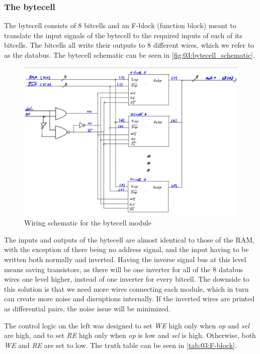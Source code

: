 \subsubsection{The bytecell}
The bytecell consists of 8 bitcells and an F-block (function block) meant to translate the input signals of the bytecell to the required inputs of each of its bitcells. The bitcells all write their outputs to 8 different wires, which we refer to as the databus. The bytecell schematic can be seen in \autoref{fig:03:bytecell_schematic}.

\begin{figure}[H]
    \centering
    \includegraphics[trim=0cm 0cm 0cm 0.3cm, clip, width=0.8\linewidth]{LaTeX_2/Figures/bytecell_schematic.png}
    \caption{Wiring schematic for the bytecell module}
    \label{fig:03:bytecell_schematic}
\end{figure}

The inputs and outputs of the bytecell are almost identical to those of the RAM, with the exception of there being no address signal, and the input having to be written both normally and inverted. Having the inverse signal bus at this level means saving transistors, as there will be one inverter for all of the 8 databus wires one level higher, instead of one inverter for every bitcell. The downside to this solution is that we need more wires connecting each module, which in turn can create more noise and disruptions internally. If the inverted wires are printed as differential pairs, the noise issue will be minimized. 

The control logic on the left was designed to set \textit{WE} high only when \textit{op} and \textit{sel} are high, and to set \textit{RE} high only when \textit{op} is low and \textit{sel} is high. Otherwise, both \textit{WE} and \textit{RE} are set to low. The truth table can be seen in \autoref{tab:03:F-block}.

